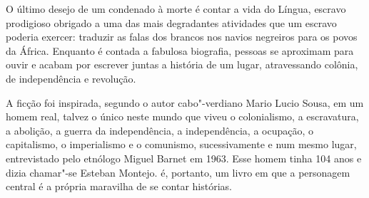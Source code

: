 \hspace*{-7cm}\hrulefill\hspace*{-7cm}

\medskip

\noindent{}O último desejo de um condenado à morte é contar a vida do Língua, escravo prodigioso obrigado a uma das mais degradantes atividades que um escravo poderia exercer: traduzir as falas dos brancos nos navios negreiros para os povos da África. Enquanto é contada a fabulosa biografia, pessoas se aproximam para ouvir e acabam por escrever juntas a história de um lugar, atravessando colônia, de independência e revolução.

A ficção foi inspirada, segundo o autor cabo"-verdiano Mario Lucio Sousa, em um homem real, talvez o único neste mundo que viveu o colonialismo, a escravatura, a abolição, a guerra da independência, a independência, a ocupação, o capitalismo, o imperialismo e o comunismo, sucessivamente e num mesmo lugar, entrevistado pelo etnólogo Miguel Barnet em 1963. Esse homem tinha 104 anos e dizia chamar"-se Esteban Montejo. {} é, portanto, um livro em que a personagem central é a própria maravilha de se contar histórias.

\vfill
\enlargethispage{\baselineskip}

\hspace*{-.4cm}\begin{minipage}[c]{.5\linewidth}
\small{
{}}
\end{minipage}

\pagebreak %


